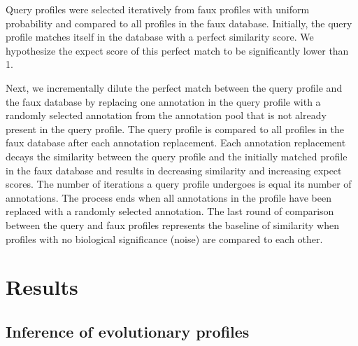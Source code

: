 \documentclass{article}
\begin{document}
Query profiles were selected iteratively from faux profiles with uniform probability and compared to all profiles in the faux database. Initially, the query profile matches itself in the database with a perfect similarity score. We hypothesize the expect score of this perfect match to be significantly lower than 1. 

Next, we incrementally dilute the perfect match between the query profile and the faux database by replacing one annotation in the query profile with a randomly selected annotation from the annotation pool that is not already present in the query profile. The query profile is compared to all profiles in the faux database after each annotation replacement. Each annotation replacement decays the similarity between the query profile and the initially matched profile in the faux database and results in decreasing similarity and increasing expect scores. The number of iterations a query profile undergoes is equal its number of annotations. The process ends when all annotations in the profile have been replaced with a randomly selected annotation. The last round of comparison between the query and faux profiles represents the baseline of similarity when profiles with no biological significance (noise) are compared to each other.  

\section{Results}
\subsection{Inference of evolutionary profiles}


\end{document}
